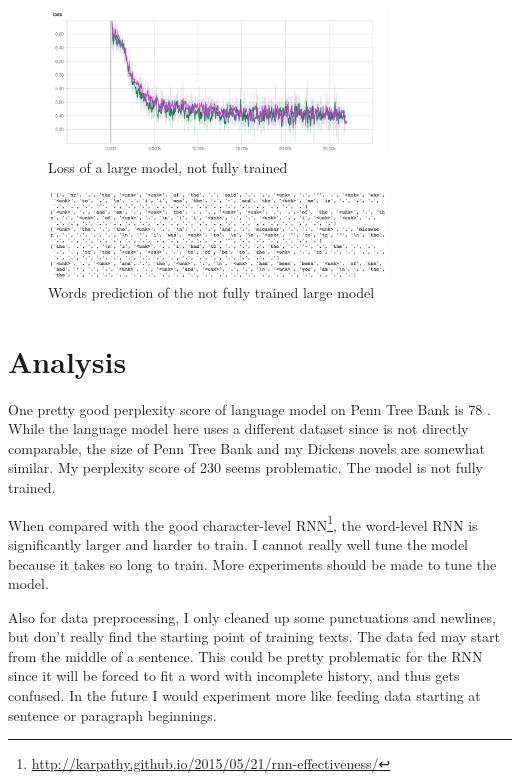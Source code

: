 \documentclass[a4paper]{article}
\begin{document}
\begin{figure}[H]
\centering
\includegraphics[width=0.8\textwidth]{large_loss.png}
\caption{Loss of a large model, not fully trained}
\end{figure}

\begin{figure}[H]
\centering
\includegraphics[width=0.8\textwidth]{large_prediction.png}
\caption{Words prediction of the not fully trained large model}
\end{figure}

\section{Analysis}
One pretty good perplexity score of language model on Penn Tree Bank is 78 \citep{zaremba2014recurrent}. While the language model here uses a different dataset since is not directly comparable, the size of Penn Tree Bank and my Dickens novels are somewhat similar. My perplexity score of 230 seems problematic. The model is not fully trained.

When compared with the good character-level RNN\footnote{\url{http://karpathy.github.io/2015/05/21/rnn-effectiveness/}}, the word-level RNN is significantly larger and harder to train. I cannot really well tune the model because it takes so long to train. More experiments should be made to tune the model.

Also for data preprocessing, I only cleaned up some punctuations and newlines, but don't really find the starting point of training texts. The data fed may start from the middle of a sentence. This could be pretty problematic for the RNN since it will be forced to fit a word with incomplete history, and thus gets confused. In the future I would experiment more like feeding data starting at sentence or paragraph beginnings.
\end{document}
